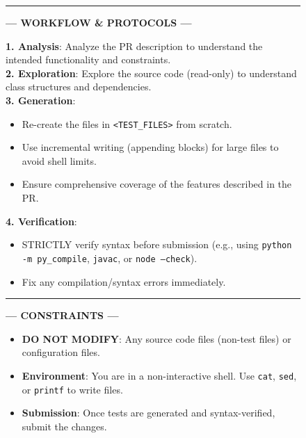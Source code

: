\documentclass[11pt]{article}
\begin{document}
\begin{figure}[t!]
\begin{tcolorbox}
    \vspace{10pt}
    \hrule
    \vspace{10pt}

    \begin{center}
        \color{teal!80!black}\textbf{--- WORKFLOW \& PROTOCOLS ---}
    \end{center}
    \vspace{5pt}

    \textbf{1. Analysis}: Analyze the PR description to understand the intended functionality and constraints. \\
    \textbf{2. Exploration}: Explore the source code (read-only) to understand class structures and dependencies. \\
    \textbf{3. Generation}:
    \begin{itemize}[leftmargin=1.5em, nosep]
        \item Re-create the files in \texttt{<TEST\_FILES>} from scratch.
        \item Use incremental writing (appending blocks) for large files to avoid shell limits.
        \item Ensure comprehensive coverage of the features described in the PR.
    \end{itemize}
    \textbf{4. Verification}:
    \begin{itemize}[leftmargin=1.5em, nosep]
        \item STRICTLY verify syntax before submission (e.g., using \texttt{python -m py\_compile}, \texttt{javac}, or \texttt{node --check}).
        \item Fix any compilation/syntax errors immediately.
    \end{itemize}

    \vspace{10pt}
    \hrule
    \vspace{10pt}

    \begin{center}
        \color{orange!80!black}\textbf{--- CONSTRAINTS ---}
    \end{center}
    \vspace{5pt}

    \begin{itemize}[leftmargin=1.5em, nosep]
        \item \textbf{DO NOT MODIFY}: Any source code files (non-test files) or configuration files.
        \item \textbf{Environment}: You are in a non-interactive shell. Use \texttt{cat}, \texttt{sed}, or \texttt{printf} to write files.
        \item \textbf{Submission}: Once tests are generated and syntax-verified, submit the changes.
    \end{itemize}


\end{tcolorbox}
\end{figure}
\end{document}
